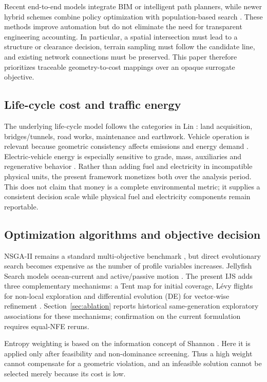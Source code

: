 \documentclass[preprint,12pt]{elsarticle}
\begin{document}
Recent end-to-end models integrate BIM or intelligent path planners, while newer hybrid schemes combine policy optimization with population-based search \cite{han2023,pu2024,pu2026}. These methods improve automation but do not eliminate the need for transparent engineering accounting. In particular, a spatial intersection must lead to a structure or clearance decision, terrain sampling must follow the candidate line, and existing network connections must be preserved. This paper therefore prioritizes traceable geometry-to-cost mappings over an opaque surrogate objective.

\subsection{Life-cycle cost and traffic energy}

The underlying life-cycle model follows the categories in Lin \cite{lin2025}: land acquisition, bridges/tunnels, road works, maintenance and earthwork. Vehicle operation is relevant because geometric consistency affects emissions and energy demand \cite{llopis2019}. Electric-vehicle energy is especially sensitive to grade, mass, auxiliaries and regenerative behavior \cite{dimartino2022}. Rather than adding fuel and electricity in incompatible physical units, the present framework monetizes both over the analysis period. This does not claim that money is a complete environmental metric; it supplies a consistent decision scale while physical fuel and electricity components remain reportable.

\subsection{Optimization algorithms and objective decision}

NSGA-II remains a standard multi-objective benchmark \cite{deb2002}, but direct evolutionary search becomes expensive as the number of profile variables increases. Jellyfish Search models ocean-current and active/passive motion \cite{chou2021}. The present IJS adds three complementary mechanisms: a Tent map for initial coverage, L\'evy flights for non-local exploration and differential evolution (DE) for vector-wise refinement \cite{storn1997}. Section~\ref{sec:ablation} reports historical same-generation exploratory associations for these mechanisms; confirmation on the current formulation requires equal-NFE reruns.

Entropy weighting is based on the information concept of Shannon \cite{shannon1948}. Here it is applied only after feasibility and non-dominance screening. Thus a high weight cannot compensate for a geometric violation, and an infeasible solution cannot be selected merely because its cost is low.
\end{document}
